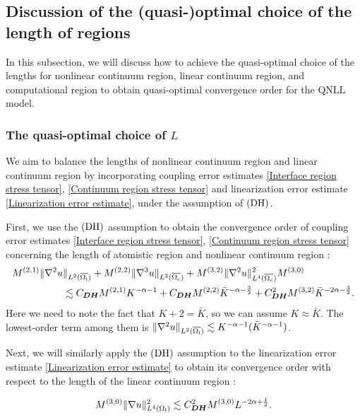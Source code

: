 \subsection{Discussion of the (quasi-)optimal choice of the length of regions}
\label{sec: balance_of_qnll_ncg_model}

In this subsection, we will discuss how to achieve the quasi-optimal choice of the lengths for nonlinear continuum region, linear continuum region, and computational region to obtain quasi-optimal convergence order for the QNLL model.

\subsubsection{The quasi-optimal choice of $L$}
\label{sec: choice_of_L_ncg}

We aim to balance the lengths of nonlinear continuum region and linear continuum region by incorporating coupling error estimates \eqref{Interface region stress tensor}, \eqref{Continuum region stress tensor} and linearization error estimate \eqref{Linearization error estimate}, under the assumption of $\textbf{\rm (DH)}$.

First, we use the $\textbf{\rm (DH)}$ assumption to obtain the convergence order of coupling error estimates \eqref{Interface region stress tensor}, \eqref{Continuum region stress tensor} concerning the length of atomistic region and nonlinear continuum region :
\begin{equation*}
	\begin{split}
		M^{(2,1)}\Vert \nabla^{2} u&\Vert_{L^{2}(\overline{\Omega_{{\rm i}}})} +M^{(2,2)}\Vert \nabla^{3}u \Vert_{L^{2}(\overline{\Omega_{{\rm c}}})}+M^{(3,2)}\Vert \nabla^{2}u \Vert^{2}_{L^{4}(\overline{\Omega_{{\rm c}}})}M^{(3,0)}\\
		&\lesssim C_{\bm{DH}} M^{(2,1)}K^{-\alpha -1}+C_{\bm{DH}} M^{(2,2)}\bar{K}^{-\alpha-\frac{3}{2}} +C_{\bm{DH}}^{2}M^{(3,2)}\bar{K}^{-2\alpha -\frac{3}{2}}.
	\end{split}
\end{equation*}
Here we need to note the fact that $K + 2 = \bar{K}$, so we can assume $K\approx \bar{K}$. The lowest-order term among them is $\Vert \nabla^{2} u\Vert_{L^{2}(\overline{\Omega_{{\rm i}}})} \lesssim K^{-\alpha-1}(\bar{K}^{-\alpha-1})$.

Next, we will similarly apply the $\textbf{\rm (DH)}$ assumption to the linearization error estimate \eqref{Linearization error estimate} to obtain its convergence order with respect to the length of the linear continuum region :

\begin{equation*}
	M^{(3,0)}\Vert \nabla u \Vert^{2}_{L^{4}(\Omega_{{\rm l}})} \lesssim C_{\bm{DH}}^{2}M^{(3,0)}L^{-2\alpha+\frac{1}{2}}.
\end{equation*}

